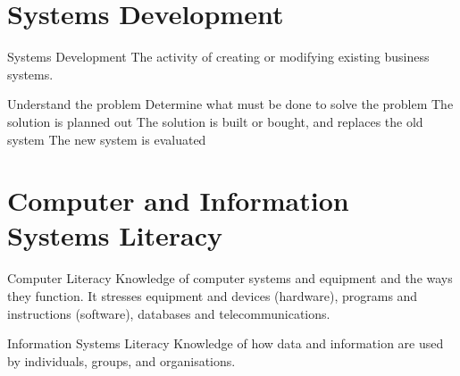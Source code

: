 \documentclass[\main/notes.tex]{subfiles}
\begin{document}
			\section{Systems Development}
				\begin{definition}{Systems Development}
					The activity of creating or modifying existing business systems.
				\end{definition}
				\begin{enumerate}
					 Understand the problem
					 Determine what must be done to solve the problem
					 The solution is planned out
					 The solution is built or bought, and replaces the old system
					 The new system is evaluated 
				\end{enumerate}
			\section{Computer and Information Systems Literacy}
				\begin{definition}{Computer Literacy}
					Knowledge of computer systems and equipment and the ways they function. It stresses equipment and devices (hardware), programs and instructions (software), databases and telecommunications.
				\end{definition}
				\begin{definition}{Information Systems Literacy}
					Knowledge of how data and information are used by individuals, groups, and organisations.
				\end{definition}
\end{document}
